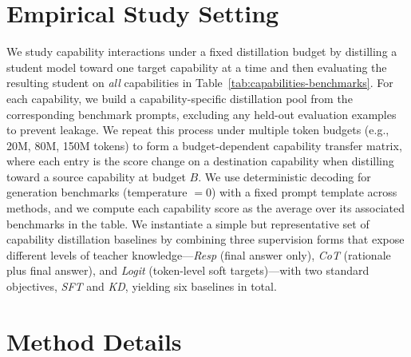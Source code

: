 \section{Empirical Study Setting}\label{sec:app_em}

We study capability interactions under a fixed distillation budget by distilling a student model toward one target capability at a time and then evaluating the resulting student on \emph{all} capabilities in Table~\ref{tab:capabilities-benchmarks}. 
For each capability, we build a capability-specific distillation pool from the corresponding benchmark prompts, excluding any held-out evaluation examples to prevent leakage. 
We repeat this process under multiple token budgets (e.g., 20M, 80M, 150M tokens) to form a budget-dependent capability transfer matrix, where each entry is the score change on a destination capability when distilling toward a source capability at budget $B$. 
We use deterministic decoding for generation benchmarks (temperature $=0$) with a fixed prompt template across methods, and we compute each capability score as the average over its associated benchmarks in the table. We instantiate a simple but representative set of capability distillation baselines by combining three supervision forms that expose different levels of teacher knowledge---\textit{Resp} (final answer only), \textit{CoT} (rationale plus final answer), and \textit{Logit} (token-level soft targets)—with two standard objectives, \textit{SFT} and \textit{KD}, yielding six baselines in total.


\section{Method Details}\label{sec:app_method}

